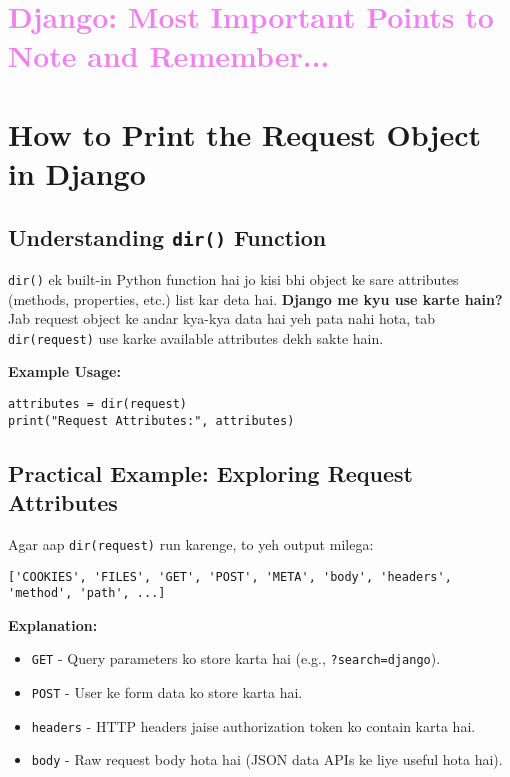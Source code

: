 \documentclass[a4paper]{article}
\newcommand{\sectiondivider}{\noindent\makebox[\linewidth]{\rule{\textwidth}{0.4pt}}}
\begin{document}
\section*{\textbf{\LARGE \textcolor{violet}{Django: Most Important Points to Note and Remember...}}}

\vspace{\baselineskip}

\sectiondivider

\section*{\textbf{How to Print the Request Object in Django}}

\subsection*{\textbf{Understanding \texttt{dir()} Function}}
\texttt{dir()} ek built-in Python function hai jo kisi bhi object ke sare attributes (methods, properties, etc.) list kar deta hai.\newline
\textbf{Django me kyu use karte hain?} Jab request object ke andar kya-kya data hai yeh pata nahi hota, tab \texttt{dir(request)} use karke available attributes dekh sakte hain.

\textcolor{examplecolor}{\textbf{Example Usage:}}
\begin{lstlisting}
attributes = dir(request)
print("Request Attributes:", attributes)
\end{lstlisting}

\subsection*{\textbf{Practical Example: Exploring Request Attributes}}
Agar aap \texttt{dir(request)} run karenge, to yeh output milega:
\begin{lstlisting}
['COOKIES', 'FILES', 'GET', 'POST', 'META', 'body', 'headers', 'method', 'path', ...]
\end{lstlisting}
\textbf{Explanation:}
\begin{itemize}
    \item \texttt{GET} - Query parameters ko store karta hai (e.g., \texttt{?search=django}).
    \item \texttt{POST} - User ke form data ko store karta hai.
    \item \texttt{headers} - HTTP headers jaise authorization token ko contain karta hai.
    \item \texttt{body} - Raw request body hota hai (JSON data APIs ke liye useful hota hai).
\end{itemize}
\end{document}
